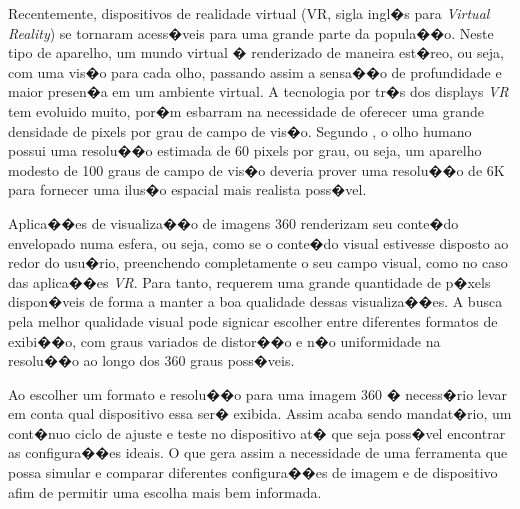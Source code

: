 \documentclass[12pt]{article}
\begin{document}
Recentemente, dispositivos de realidade virtual (VR, sigla ingl�s para \textit{Virtual Reality}) se tornaram acess�veis para uma grande parte da popula��o. Neste tipo de aparelho, um mundo virtual � renderizado de maneira est�reo, ou seja, com uma vis�o para cada olho, passando assim a sensa��o de profundidade e maior presen�a em um ambiente virtual. A tecnologia por tr�s dos displays \textit{VR} tem evoluido muito, por�m esbarram na necessidade de oferecer uma grande densidade de pixels por grau de campo de vis�o. Segundo \cite{va1965visual}, o olho humano possui uma resolu��o estimada de 60 pixels por grau, ou seja, um aparelho modesto de 100 graus de campo de vis�o deveria prover uma resolu��o de 6K para fornecer uma ilus�o espacial mais realista poss�vel.

Aplica��es de visualiza��o de imagens 360 renderizam seu conte�do envelopado numa esfera, ou seja, como se o conte�do visual estivesse disposto ao redor do usu�rio, preenchendo completamente o seu campo visual, como no caso das aplica��es \textit{VR}. Para tanto, requerem uma grande quantidade de p�xels dispon�veis de forma a manter a boa qualidade dessas visualiza��es. A busca pela melhor qualidade visual pode signicar escolher entre diferentes formatos de exibi��o, com graus variados de distor��o e n�o uniformidade na resolu��o ao longo dos 360 graus poss�veis.




Ao escolher um formato e resolu��o para uma imagem 360 � necess�rio levar em conta qual dispositivo essa ser� exibida. Assim acaba sendo mandat�rio, um cont�nuo ciclo de ajuste e teste no dispositivo at� que seja poss�vel encontrar as configura��es ideais. O que gera assim a necessidade de uma ferramenta que possa simular e comparar diferentes configura��es de imagem e de dispositivo afim de permitir uma escolha mais bem informada.
\end{document}

